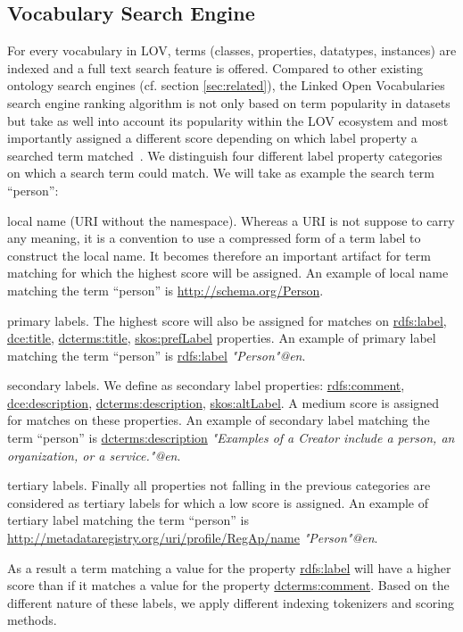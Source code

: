 \documentclass{iosart2c}
\newcommand{\figfontsize}{\footnotesize}
\begin{document}
	
	\begin{figure}[tb]
	\ffigbox{%
		\figfontsize%
	}{%
	  \caption{\label{fig:evolLOV} Evolution of the number of vocabularies in LOV.}%
	}
	\end{figure}

	\subsection{Vocabulary Search Engine}
	For every vocabulary in LOV, terms (classes, properties, datatypes, instances) are indexed and a full text search feature is offered. Compared to other existing ontology search engines (cf. section \ref{sec:related}), the Linked Open Vocabularies search engine ranking algorithm is not only based on term popularity in datasets but take as well into account its popularity within the LOV ecosystem and most importantly assigned a different score depending on which label property a searched term matched~\cite{butt2014}. We distinguish four different label property categories on which a search term could match. We will take as example the search term ``person'': 
		\begin{inparaenum}[1)] 
			\item local name (URI without the namespace). Whereas a URI is not suppose to carry any meaning, it is a convention to use a compressed form of a term label to construct the local name. It becomes therefore an important artifact for term matching for which the highest score will be assigned. An example of local name matching the term ``person'' is \url{http://schema.org/Person}.
			\item primary labels. The highest score will also be assigned for matches on \url{rdfs:label}, \url{dce:title}, \url{dcterms:title}, \url{skos:prefLabel} properties. An example of primary label matching the term ``person'' is \url{rdfs:label} \emph{"Person"@en}.
			\item secondary labels. We define as secondary label properties: \url{rdfs:comment}, \url{dce:description}, \url{dcterms:description}, \url{skos:altLabel}. A medium score is assigned for matches on these properties. An example of secondary label matching the term ``person'' is \url{dcterms:description} \emph{"Examples of a Creator include a person, an organization, or a service."@en}.
			\item tertiary labels. Finally all properties not falling in the previous categories are considered as tertiary labels for which a low score is assigned. An example of tertiary label matching the term ``person'' is \url{http://metadataregistry.org/uri/profile/RegAp/name} \emph{"Person"@en}. 
		\end{inparaenum}
As a result a term matching a value for the property \url{rdfs:label} will have a higher score than if it matches a value for the property \url{dcterms:comment}. Based on the different nature of these labels, we apply different indexing tokenizers and scoring methods.
\end{document}
